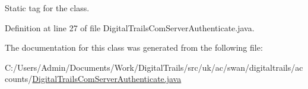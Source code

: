 Static tag for the class. 



Definition at line 27 of file Digital\+Trails\+Com\+Server\+Authenticate.\+java.



The documentation for this class was generated from the following file\+:\begin{DoxyCompactItemize}
\item 
C\+:/\+Users/\+Admin/\+Documents/\+Work/\+Digital\+Trails/src/uk/ac/swan/digitaltrails/accounts/\hyperlink{_digital_trails_com_server_authenticate_8java}{Digital\+Trails\+Com\+Server\+Authenticate.\+java}\end{DoxyCompactItemize}
